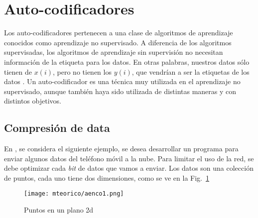 \section{Auto-codificadores}

    Los auto-codificadores pertenecen a una clase de algoritmos de aprendizaje conocidos como aprendizaje no supervisado. A diferencia de los algoritmos supervisadas, los algoritmos de aprendizaje sin supervisión no necesitan información de la etiqueta para los datos. En otras palabras, nuestros datos sólo tienen de $x(i)$, pero no tienen los $y(i)$, que vendrían a ser la etiquetas de los datos \cite{Le15atutorial, website:UFLDL}. Un auto-codificador es una técnica muy utilizada en el aprendizaje no supervisado, aunque también haya sido utilizada de distintas maneras y con distintos objetivos.

    \subsection{Compresión de data}

    En \cite{Le15atutorial}, se considera el siguiente ejemplo, se desea desarrollar un programa para enviar algunos datos del teléfono móvil a la nube. Para limitar el uso de la red, se debe optimizar cada \textit{bit} de datos que vamos a enviar. Los datos son una colección de puntos, cada uno tiene dos dimensiones, como se ve en la Fig.~\ref{fig:aenco1}
    \begin{figure}[htp]
        \centering
        \texttt{[image: mteorico/aenco1.png]}
        \caption{Puntos en un plano 2d}
        \label{fig:aenco1}
    \end{figure}

